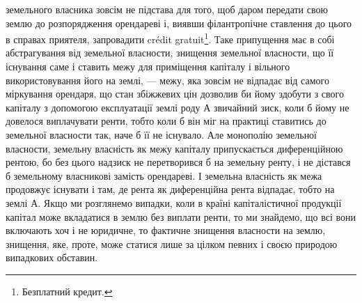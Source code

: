 \parcont{}  %
земельного власника зовсім не підстава для того, щоб даром передати свою землю
до розпорядження орендареві і, виявши філантропічне ставлення до цього в
справах приятеля, запровадити crédit gratuit\footnote*{
Безплатний кредит. 
}. Таке припущення має в собі
абстрагування від земельної власности, знищення земельної власности, що її
існування саме і ставить межу для приміщення капіталу і вільного використовування
його на землі, — межу, яка зовсім не відпадає від самого міркування
орендаря, що стан збіжжевих цін дозволив би йому здобути з свого
капіталу з допомогою експлуатації землі роду $А$ звичайний зиск, коли б йому
не довелося виплачувати ренти, тобто коли б він міг на практиці ставитись до
земельної власности так, наче б її не існувало. Але монополію земельної власности,
земельну власність як межу капіталу припускається диференційною
рентою, бо без цього надзиск не перетворився б на земельну ренту, і не дістався
б земельному власникові замість орендареві. І земельна власність як межа
продовжує існувати і там, де рента як диференційна рента відпадає, тобто на
землі $А$. Якщо ми розглянемо випадки, коли в країні капіталістичної продукції
капітал може вкладатися в землю без виплати ренти, то ми знайдемо, що всі
вони включають хоч і не юридичне, то фактичне знищення власности на землю,
знищення, яке, проте, може статися лише за цілком певних і своєю природою
випадкових обставин.

